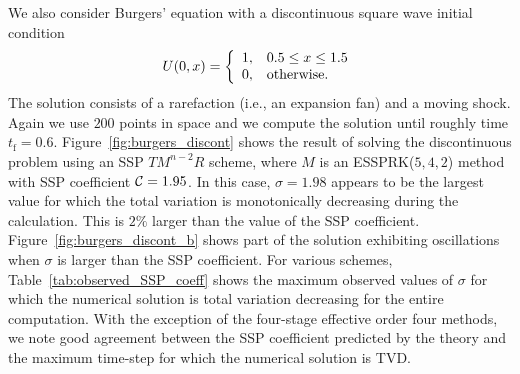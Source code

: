 We also consider Burgers' equation with a discontinuous
square wave initial condition
\begin{equation}\label{eq:burgers_discont_IC}
    U(0,x)  = \left\{
                \begin{array}{ll}
                  1, & \hbox{$0.5 \leq x \leq 1.5$} \\
                  0, & \hbox{otherwise.}
                \end{array}
              \right.
\end{equation}
The solution consists of a rarefaction (i.e., an expansion fan) and a
moving shock.
Again we use $200$ points in space and we compute the solution until
roughly time $t_\text{f} = 0.6$.
Figure~\ref{fig:burgers_discont} shows the result of solving the
discontinuous problem using an SSP $TM^{n-2}R$ scheme, where $M$ is an
ESSPRK($5,4,2$) method with SSP coefficient $\mathcal{C} = 1.95$.
In this case, $\sigma = 1.98$ appears to be the largest value
for which the total variation is monotonically decreasing during the 
calculation.
This is $2\%$ larger than the value of the SSP coefficient.
Figure~\ref{fig:burgers_discont_b} shows part of the solution exhibiting 
oscillations when $\sigma$ is larger than the SSP coefficient.
For various schemes, Table~\ref{tab:observed_SSP_coeff} shows the
maximum observed values of $\sigma$ for which the numerical solution
is total variation decreasing for the entire computation.
With the exception of the four-stage effective order four methods, we
note good agreement between the SSP coefficient predicted by the
theory and the maximum time-step for which the numerical solution is
TVD.

